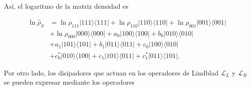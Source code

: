 \begin{appendixs}
Así, el logaritmo de la matriz densidad es 

\begin{align*}
    \ln \hat{\rho}_{S} & = \ln \rho_{111}|111\rangle \langle 111| + \ln \rho_{110}|110\rangle \langle 110| + \ln \rho_{001}|001\rangle \langle 001| \\ 
     & + \ln \rho_{000}|000\rangle \langle 000| + a_{0}|100\rangle \langle 100| + b_{0}|010\rangle \langle 010|  \\  
     & + a_{1}|101\rangle \langle 101| + b_{1}|011\rangle\langle 011| + c_{0}|100\rangle \langle 010| \\ 
     & + c^{*}_{0}|010\rangle \langle 100| + c_{1}|101\rangle \langle 011| + c^{*}_{1}|011\rangle \langle 101|.
\end{align*}

Por otro lado, los disipadores que actuan en los operadores de Lindblad $\mathcal{L}_{L}$ y $\mathcal{L}_{R}$ se pueden expresar mediante los operadores 


\end{appendixs}
